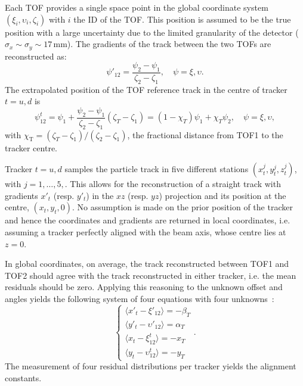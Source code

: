 Each TOF provides a single space point in the global coordinate system $(\xi_i, \upsilon_i, \zeta_i)$ with $i$ the ID of the TOF. This position is assumed to be the true position with a large uncertainty due to the limited granularity of the detector ($\sigma_x\sim\sigma_y\sim17$\,mm). The gradients of the track between the two TOFs are reconstructed as:
\begin{equation}
\psi'_{12}=\frac{\psi_2-\psi_1}{\zeta_2-\zeta_1},\quad\psi=\xi,\upsilon.
\end{equation}
The extrapolated position of the TOF reference track in the centre of tracker $t=u,d$ is
\begin{equation}
\psi_{12}^t=\psi_1+\frac{\psi_2-\psi_1}{\zeta_2-\zeta_1}(\zeta_T-\zeta_1)=(1-\chi_T)\psi_1+\chi_T\psi_2,\quad\psi=\xi,\upsilon,
\end{equation}
with $\chi_\mathrm{T}=(\zeta_T-\zeta_1)/(\zeta_2-\zeta_1)$, the fractional distance from TOF1 to the tracker centre.

Tracker $t=u,d$ samples the particle track in five different stations $(x_t^j, y_t^j, z_t^j)$, with $j=1,\dots,5,$. This allows for the reconstruction of a straight track with gradients $x'_t$ (resp. $y'_t$) in the $xz$ (resp. $yz$) projection and its position at the centre, $(x_t, y_t, 0)$. No assumption is made on the prior position of the tracker and hence the coordinates and gradients are returned in local coordinates, i.e. assuming a tracker perfectly aligned with the beam axis, whose centre lies at $z=0$.

In global coordinates, on average, the track reconstructed between TOF1 and TOF2 should agree with the track reconstructed in either tracker, i.e. the mean residuals should be zero. Applying this reasoning to the unknown offset and angles yields the following system of four equations with four unknowns~\cite{2018arXiv1805.06623T}:
\begin{equation}
\left\{
\begin{array}{l}
\langle x'_t-\xi'_{12}\rangle = - \beta_T \\
\langle y'_t-\upsilon'_{12}\rangle = \alpha_T \\
\langle x_t-\xi_{12}^t\rangle = - x_T \\
\langle y_t-\upsilon_{12}^t\rangle = - y_T
\end{array}
\right. .
\label{eq:res}
\end{equation}
The measurement of four residual distributions per tracker yields the alignment constants.

